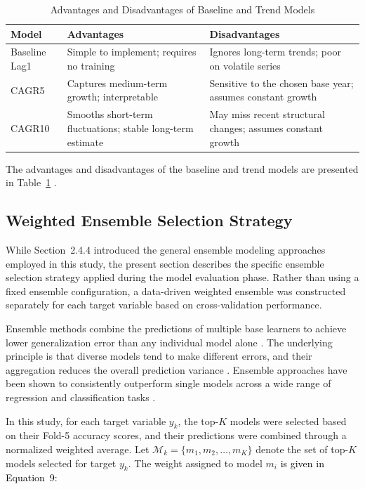 \documentclass[final, 9pt, twocolumn]{saucis}
\newcommand{\rev}[1]{\textcolor{black}{#1}}
\begin{document}
\begin{table}[htbp]
\centering
\caption{Advantages and Disadvantages of Baseline and Trend Models}
\label{tab:baseline_pros_cons}
\small
\begin{tabular}{p{1.0cm} p{3.25cm} p{3.25cm}}
\hline
Model & Advantages & Disadvantages \\
\hline
Baseline Lag1
& Simple to implement; requires no training
& Ignores long-term trends; poor on volatile series \\
CAGR5
& Captures medium-term growth; interpretable
& Sensitive to the chosen base year; assumes constant growth \\
CAGR10
& Smooths short-term fluctuations; stable long-term estimate
& May miss recent structural changes; assumes constant growth \\
\hline
\end{tabular}
\end{table}

The advantages and disadvantages of the baseline and trend models are presented in Table~\ref{tab:baseline_pros_cons} .

\subsection{Weighted Ensemble Selection Strategy}

While Section~2.4.4 introduced the general ensemble modeling 
approaches employed in this study, the present section describes 
the specific ensemble selection strategy applied during the 
model evaluation phase. Rather than using a fixed ensemble 
configuration, a data-driven weighted ensemble was constructed 
separately for each target variable based on cross-validation 
performance.

Ensemble methods combine the predictions of multiple base learners to achieve lower generalization error than any individual model alone \cite{methodnew8}. The underlying principle is that diverse models tend to make different errors, and their aggregation reduces the overall prediction variance \cite{methodnew9}. Ensemble approaches have been shown to consistently outperform single models across a wide range of regression and classification tasks \cite{methodnew10}.

In this study, for each target variable $y_k$, the top-$K$ models 
were selected based on their Fold-5 accuracy scores, and their 
predictions were combined through a normalized weighted average. 
Let $\mathcal{M}_k = \{m_1, m_2, \ldots, m_K\}$ denote the set of 
top-$K$ models selected for target $y_k$. The weight assigned to 
model $m_i$ \rev{is given in Equation~9}:
\end{document}
